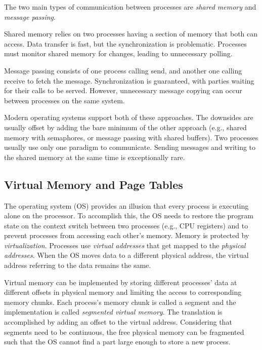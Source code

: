 The two main types of communication between processes are \emph{shared memory} 
and \emph{message passing}\cite{silberschatz2018operating}.

Shared memory relies on two processes having a section of memory that both can 
access. Data transfer is fast, but the synchronization is problematic. 
Processes must monitor shared memory for changes, leading to unnecessary
polling.

Message passing consists of one process calling send, and another one calling
receive to fetch the message. Synchronization is guaranteed, with parties
waiting for their calls to be served. However, unnecessary message copying can
occur between processes on the same system. 

Modern operating systems support both of these approaches. The downsides are
usually offset by adding the  bare minimum of the other approach (e.g., shared
memory with semaphores, or message passing with shared buffers). Two processes
usually use only one paradigm to communicate. Sending messages and writing
to the shared memory at the same time is exceptionally rare. 

\subsection{Virtual Memory and Page Tables} \label{subsec:vm}

The operating system (OS) provides an illusion that every process is executing alone
on the processor. To accomplish this, the OS needs to restore the program state
on the context switch between two processes (e.g., CPU registers) and to prevent 
processes from accessing each other's memory. Memory is protected by
\emph{virtualization}. Processes use \emph{virtual addresses} that get mapped to
the \emph{physical addresses}. When the OS moves data to a different physical 
address, the virtual address referring to the data remains the same. 

Virtual memory can be implemented by storing different processes' data at 
different offsets in physical memory and limiting the access to corresponding 
memory chunks. Each process's memory chunk is called a segment and the 
implementation is called \emph{segmented virtual memory}. The translation is 
accomplished by adding an offset to the virtual address. Considering that 
segments need to be continuous, the free physical memory can be fragmented
such that the OS cannot find a part large enough to store a new process.

